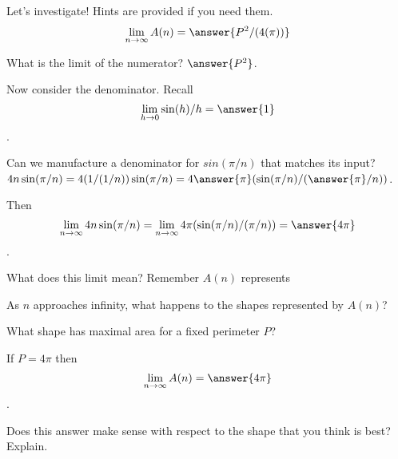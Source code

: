 \documentclass[handout,nooutcomes]{ximera}
\begin{document}
\begin{exercise}
Let's investigate! Hints are provided if you need them.\\
\[\lim_{n \to \infty}A(n) = \answer{P^2/(4(\pi))}\]
\begin{hint}
	What is the limit of the numerator? $\answer{P^2}$.
\end{hint}
\begin{hint}
  Now consider the denominator. Recall \[\lim_{h \to 0} \sin(h)/h = \answer{1}\].
\end{hint}
\begin{hint}
  Can we manufacture a denominator for $sin(\pi/n)$ that matches its input?\\
  $4n\sin(\pi/n) = 4(1/(1/n))\sin(\pi/n) = 4\answer{\pi}(\sin(\pi/n)/(\answer{\pi}/n))$.
\end{hint}
\begin{hint}
  Then \[\lim_{n \to \infty} 4n\sin(\pi/n) = \lim_{n \to \infty} 4\pi(\sin(\pi/n)/(\pi/n)) = \answer{4\pi}\].
\end{hint}
\end{exercise}

What does this limit mean? Remember $A(n)$ represents
\begin{multipleChoice}
\end{multipleChoice}
\begin{freeResponse}
As $n$ approaches infinity, what happens to the shapes represented by $A(n)$?
\end{freeResponse}

What shape has maximal area for a fixed perimeter $P$?
\begin{multipleChoice}
\end{multipleChoice}

\bigskip

If $P = 4\pi$ then \[\lim_{n \to \infty} A(n) = \answer{4\pi}\].\\
\begin{freeResponse}
Does this answer make sense with respect to the shape that you think is best? Explain.
\end{freeResponse}
\end{document}
